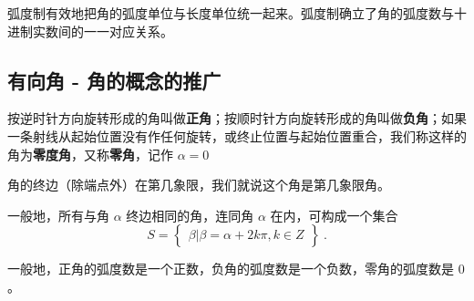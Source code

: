 弧度制有效地把角的弧度单位与长度单位统一起来。弧度制确立了角的弧度数与十进制实数间的一一对应关系。



\subsection{有向角 - 角的概念的推广}


按逆时针方向旋转形成的角叫做\textbf{正角}；按顺时针方向旋转形成的角叫做\textbf{负角}；如果一条射线从起始位置没有作任何旋转，或终止位置与起始位置重合，我们称这样的角为\textbf{零度角}，又称\textbf{零角}，记作 $\alpha = 0$

角的终边（除端点外）在第几象限，我们就说这个角是第几象限角。

一般地，所有与角 $\alpha$ 终边相同的角，连同角 $\alpha$ 在内，可构成一个集合
\begin{equation}
S = \begin{Bmatrix} \beta|\beta=\alpha+2k\pi,k \in Z \end{Bmatrix}~.
\end{equation}


一般地，正角的弧度数是一个正数，负角的弧度数是一个负数，零角的弧度数是 $0$。
